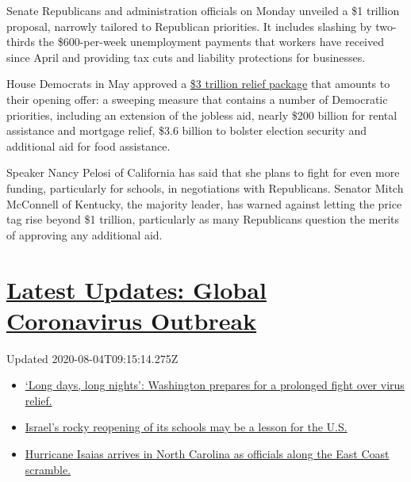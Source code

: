 Senate Republicans and administration officials on Monday unveiled a \$1
trillion proposal, narrowly tailored to Republican priorities. It
includes slashing by two-thirds the \$600-per-week unemployment payments
that workers have received since April and providing tax cuts and
liability protections for businesses.

House Democrats in May approved a
\href{https://www.congress.gov/116/bills/hr6800/BILLS-116hr6800ih.pdf}{\$3
trillion relief package} that amounts to their opening offer: a sweeping
measure that contains a number of Democratic priorities, including an
extension of the jobless aid, nearly \$200 billion for rental assistance
and mortgage relief, \$3.6 billion to bolster election security and
additional aid for food assistance.

Speaker Nancy Pelosi of California has said that she plans to fight for
even more funding, particularly for schools, in negotiations with
Republicans. Senator Mitch McConnell of Kentucky, the majority leader,
has warned against letting the price tag rise beyond \$1 trillion,
particularly as many Republicans question the merits of approving any
additional aid.

\hypertarget{latest-updates-global-coronavirus-outbreak}{%
\section{\texorpdfstring{\href{https://www.nytimes.com/2020/08/04/world/coronavirus-covid-19.html?action=click\&pgtype=Article\&state=default\&region=MAIN_CONTENT_1\&context=storylines_live_updates}{Latest
Updates: Global Coronavirus
Outbreak}}{Latest Updates: Global Coronavirus Outbreak}}\label{latest-updates-global-coronavirus-outbreak}}

Updated 2020-08-04T09:15:14.275Z

\begin{itemize}
\tightlist
\item
  \href{https://www.nytimes.com/2020/08/04/world/coronavirus-covid-19.html?action=click\&pgtype=Article\&state=default\&region=MAIN_CONTENT_1\&context=storylines_live_updates\#link-6b644638}{`Long
  days, long nights': Washington prepares for a prolonged fight over
  virus relief.}
\item
  \href{https://www.nytimes.com/2020/08/04/world/coronavirus-covid-19.html?action=click\&pgtype=Article\&state=default\&region=MAIN_CONTENT_1\&context=storylines_live_updates\#link-7af9fca0}{Israel's
  rocky reopening of its schools may be a lesson for the U.S.}
\item
  \href{https://www.nytimes.com/2020/08/04/world/coronavirus-covid-19.html?action=click\&pgtype=Article\&state=default\&region=MAIN_CONTENT_1\&context=storylines_live_updates\#link-33bf9168}{Hurricane
  Isaias arrives in North Carolina as officials along the East Coast
  scramble.}
\end{itemize}

